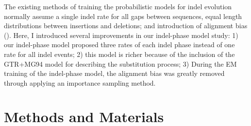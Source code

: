 \indent The existing methods of training the probabilistic models for indel evolution normally assume a single indel rate for all gaps between sequences, equal length distributions between insertions and deletions; and introduction of alignment bias (\cite{holmes2005using, lunter2007probabilistic, cartwright2009problems}). Here, I introduced several improvements in our indel-phase model study: 1) our indel-phase model proposed three rates of each indel phase instead of one rate for all indel events; 2) this model is richer because of the inclusion of the GTR+MG94 model for describing the substitution process; 3) During the EM training of the indel-phase model, the alignment bias was greatly removed through applying an importance sampling method. 


\section{Methods and Materials} 
